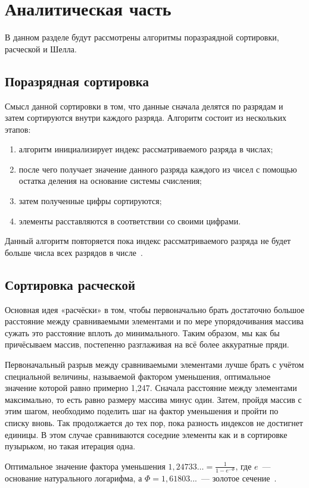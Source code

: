 \chapter{Аналитическая часть}
В данном разделе будут рассмотрены алгоритмы поразраядной сортировки, расческой и Шелла.

\section{Поразрядная сортировка}
Смысл данной сортировки в том, что данные сначала делятся по разрядам и затем сортируются внутри каждого разряда.
Алгоритм состоит из нескольких этапов:
\begin{enumerate}
	\item алгоритм инициализирует индекс рассматриваемого разряда в числах;
	\item после чего получает значение данного разряда каждого из чисел с помощью остатка деления на основание системы счисления;
	\item затем полученные цифры сортируются;
	\item элементы расставляются в соответствии со своими цифрами.
\end{enumerate}
Данный алгоритм повторяется пока индекс рассматриваемого разряда не будет больше числа всех разрядов в числе~\cite{knut, article_sorts}.

\section{Сортировка расческой}
Основная идея «расчёски» в том, чтобы первоначально брать достаточно большое расстояние между сравниваемыми элементами и по мере упорядочивания массива сужать это расстояние вплоть до минимального. 
Таким образом, мы как бы причёсываем массив, постепенно разглаживая на всё более аккуратные пряди. 

Первоначальный разрыв между сравниваемыми элементами лучше брать с учётом специальной величины, называемой фактором уменьшения, оптимальное значение которой равно примерно 1,247. 
Сначала расстояние между элементами максимально, то есть равно размеру массива минус один. Затем, пройдя массив с этим шагом, необходимо поделить шаг на фактор уменьшения и пройти по списку вновь. Так продолжается до тех пор, пока разность индексов не достигнет единицы. В этом случае сравниваются соседние элементы как и в сортировке пузырьком, но такая итерация одна.

Оптимальное значение фактора уменьшения $1,24733\dots = \frac{1}{1 - e^{-\Phi}}$, где $e$~--- основание натурального логарифма, а ${\Phi =1,61803...}$~--- золотое сечение~\cite{article_sorts}.

